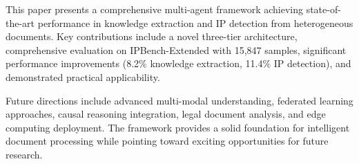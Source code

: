 \documentclass[11pt,a4paper]{article}
\begin{document}
This paper presents a comprehensive multi-agent framework achieving state-of-the-art performance in knowledge extraction and IP detection from heterogeneous documents. Key contributions include a novel three-tier architecture, comprehensive evaluation on IPBench-Extended with 15,847 samples, significant performance improvements (8.2\% knowledge extraction, 11.4\% IP detection), and demonstrated practical applicability.

Future directions include advanced multi-modal understanding, federated learning approaches, causal reasoning integration, legal document analysis, and edge computing deployment. The framework provides a solid foundation for intelligent document processing while pointing toward exciting opportunities for future research.


\end{document}
